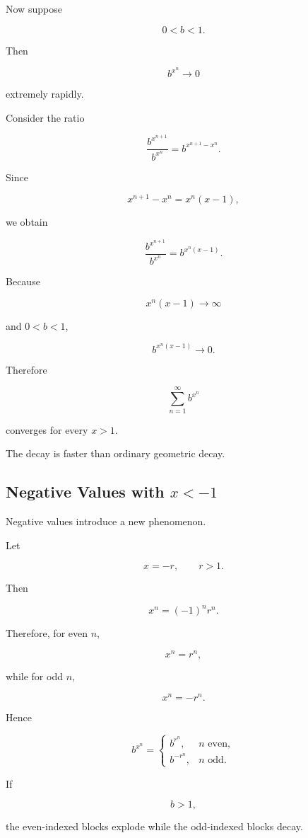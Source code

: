 Now suppose

\[
0<b<1.
\]

Then

\[
b^{x^n}\longrightarrow0
\]

extremely rapidly.

Consider the ratio

\[
\frac{b^{x^{n+1}}}{b^{x^n}}
=
b^{x^{n+1}-x^n}.
\]

Since

\[
x^{n+1}-x^n
=
x^n(x-1),
\]

we obtain

\[
\boxed{
\frac{b^{x^{n+1}}}{b^{x^n}}
=
b^{x^n(x-1)}.
}
\]

Because

\[
x^n(x-1)\to\infty
\]

and \(0<b<1\),

\[
b^{x^n(x-1)}
\longrightarrow0.
\]

Therefore

\[
\sum_{n=1}^{\infty}b^{x^n}
\]

converges for every \(x>1\).

The decay is faster than ordinary geometric decay.

\subsection{Negative Values with \texorpdfstring{$x<-1$}{x<-1}}

Negative values introduce a new phenomenon.

Let

\[
x=-r,
\qquad
r>1.
\]

Then

\[
x^n=(-1)^nr^n.
\]

Therefore, for even \(n\),

\[
x^n=r^n,
\]

while for odd \(n\),

\[
x^n=-r^n.
\]

Hence

\[
b^{x^n}
=
\begin{cases}
b^{r^n}, & n\text{ even},\\[4pt]
b^{-r^n}, & n\text{ odd}.
\end{cases}
\]

If

\[
b>1,
\]

the even-indexed blocks explode while the odd-indexed blocks decay.

